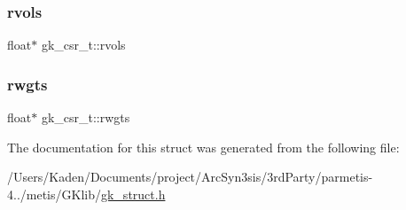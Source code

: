 \mbox{\label{a00634_a3cfbae243c346d2461e52e6985304bbb}} 
\subsubsection{\texorpdfstring{rvols}{rvols}}
{\footnotesize\ttfamily float$\ast$ gk\+\_\+csr\+\_\+t\+::rvols}

\mbox{\label{a00634_a1cdf3e25a63376b7feb3c96834f298d6}} 
\subsubsection{\texorpdfstring{rwgts}{rwgts}}
{\footnotesize\ttfamily float$\ast$ gk\+\_\+csr\+\_\+t\+::rwgts}



The documentation for this struct was generated from the following file\+:\begin{DoxyCompactItemize}
\item 
/\+Users/\+Kaden/\+Documents/project/\+Arc\+Syn3sis/3rd\+Party/parmetis-\/4../metis/\+G\+Klib/\hyperlink{a00080}{gk\+\_\+struct.\+h}\end{DoxyCompactItemize}
